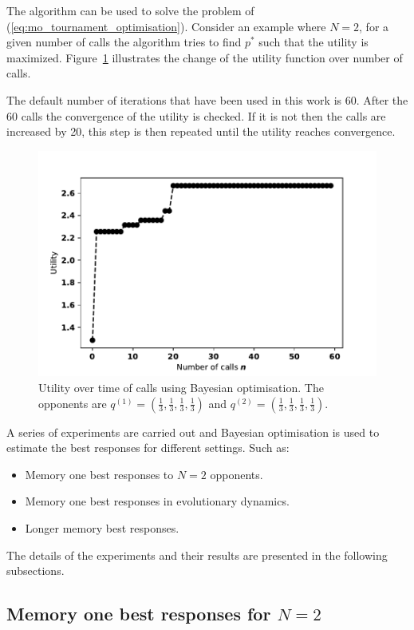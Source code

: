 \documentclass[10pt]{article}
\begin{document}
The algorithm can be used to solve the problem of
(\ref{eq:mo_tournament_optimisation}). Consider an example
where \(N=2\), for a given number of calls the algorithm tries to find \(p^*\)
such that the utility is maximized. Figure~\ref{bayesian_example} illustrates
the change of the utility function over number of calls.

The default number of iterations that have been used in this work is 60. After
the 60 calls the convergence of the utility is checked. If it is not then the
calls are increased by 20, this step is then repeated until the utility reaches
convergence.

\begin{figure}[!htbp]
    \begin{center}
    \includegraphics[width=.5\linewidth]{img/bayesian_example.pdf}
    \end{center}
    \caption{Utility over time of calls using Bayesian optimisation. The
    opponents are \(q^{(1)} = (\frac{1}{3}, \frac{1}{3}, \frac{1}{3},
    \frac{1}{3})\) and \(q^{(2)} = (\frac{1}{3}, \frac{1}{3},
    \frac{1}{3}, \frac{1}{3})\).}
    \label{bayesian_example}
\end{figure}

A series of experiments are carried out and Bayesian optimisation is used to
estimate the best responses for different settings. Such as:

\begin{itemize}
    \item Memory one best responses to \(N=2\) opponents.
    \item Memory one best responses in evolutionary dynamics.
    \item Longer memory best responses.
\end{itemize}

The details of the experiments and their results are presented in the following
subsections.

\subsection{Memory one best responses for \(N=2\)}\label{subsection:best_response_n_2}
\end{document}
